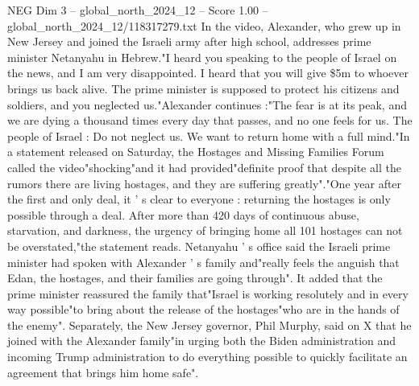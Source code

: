 \begin{textsample}{NEG Dim 3 – global\_north\_2024\_12 – Score 1.00 – global\_north\_2024\_12/118317279.txt}
In the video, Alexander, who grew up in New Jersey and joined the Israeli army after high school, addresses prime minister Netanyahu in Hebrew."I heard you speaking to the people of Israel on the news, and I am very disappointed.
I heard that you will give \$5m to whoever brings us back alive.
The prime minister is supposed to protect his citizens and soldiers, and you neglected us."Alexander continues :"The fear is at its peak, and we are dying a thousand times every day that passes, and no one feels for us.
The people of Israel : Do not neglect us.
We want to return home with a full mind."In a statement released on Saturday, the Hostages and Missing Families Forum called the video"shocking"and it had provided"definite proof that despite all the rumors there are living hostages, and they are suffering greatly"."One year after the first and only deal, it ' s clear to everyone : returning the hostages is only possible through a deal.
After more than 420 days of continuous abuse, starvation, and darkness, the urgency of bringing home all 101 hostages can not be overstated,"the statement reads.
Netanyahu ' s office said the Israeli prime minister had spoken with Alexander ' s family and"really feels the anguish that Edan, the hostages, and their families are going through".
It added that the prime minister reassured the family that"Israel is working resolutely and in every way possible"to bring about the release of the hostages"who are in the hands of the enemy".
Separately, the New Jersey governor, Phil Murphy, said on X that he joined with the Alexander family"in urging both the Biden administration and incoming Trump administration to do everything possible to quickly facilitate an agreement that brings him home safe".

\end{textsample}
